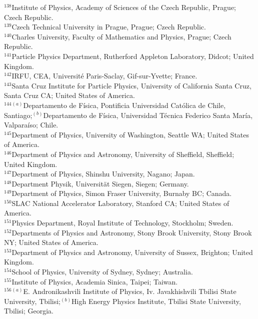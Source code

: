 \begin{flushleft}
$^{138}$Institute of Physics, Academy of Sciences of the Czech Republic, Prague; Czech Republic.\\
$^{139}$Czech Technical University in Prague, Prague; Czech Republic.\\
$^{140}$Charles University, Faculty of Mathematics and Physics, Prague; Czech Republic.\\
$^{141}$Particle Physics Department, Rutherford Appleton Laboratory, Didcot; United Kingdom.\\
$^{142}$IRFU, CEA, Universit\'e Paris-Saclay, Gif-sur-Yvette; France.\\
$^{143}$Santa Cruz Institute for Particle Physics, University of California Santa Cruz, Santa Cruz CA; United States of America.\\
$^{144}$$^{(a)}$Departamento de F\'isica, Pontificia Universidad Cat\'olica de Chile, Santiago;$^{(b)}$Departamento de F\'isica, Universidad T\'ecnica Federico Santa Mar\'ia, Valpara\'iso; Chile.\\
$^{145}$Department of Physics, University of Washington, Seattle WA; United States of America.\\
$^{146}$Department of Physics and Astronomy, University of Sheffield, Sheffield; United Kingdom.\\
$^{147}$Department of Physics, Shinshu University, Nagano; Japan.\\
$^{148}$Department Physik, Universit\"{a}t Siegen, Siegen; Germany.\\
$^{149}$Department of Physics, Simon Fraser University, Burnaby BC; Canada.\\
$^{150}$SLAC National Accelerator Laboratory, Stanford CA; United States of America.\\
$^{151}$Physics Department, Royal Institute of Technology, Stockholm; Sweden.\\
$^{152}$Departments of Physics and Astronomy, Stony Brook University, Stony Brook NY; United States of America.\\
$^{153}$Department of Physics and Astronomy, University of Sussex, Brighton; United Kingdom.\\
$^{154}$School of Physics, University of Sydney, Sydney; Australia.\\
$^{155}$Institute of Physics, Academia Sinica, Taipei; Taiwan.\\
$^{156}$$^{(a)}$E. Andronikashvili Institute of Physics, Iv. Javakhishvili Tbilisi State University, Tbilisi;$^{(b)}$High Energy Physics Institute, Tbilisi State University, Tbilisi; Georgia.\\

\end{flushleft}
